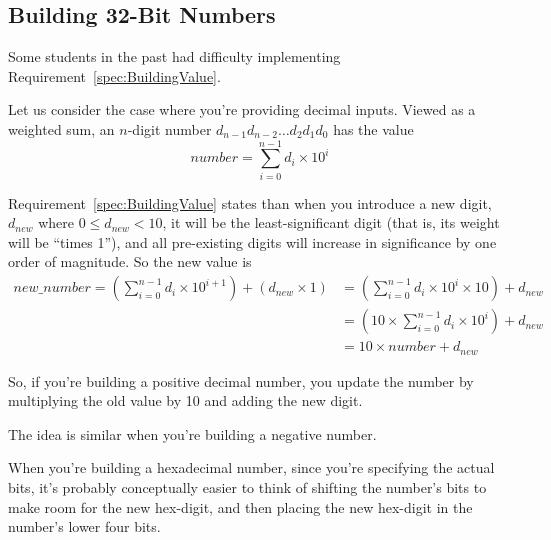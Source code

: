 

\subsection{Building 32-Bit Numbers}

Some students in the past had difficulty implementing Requirement~\ref{spec:BuildingValue}.

Let us consider the case where you're providing decimal inputs.
Viewed as a weighted sum, an $n$-digit number $d_{n-1}d_{n-2}{\dots}d_2d_1d_0$ has the value
\[number = \sum_{i=0}^{n-1}d_i \times 10^i\]

Requirement~\ref{spec:BuildingValue} states than when you introduce a new digit, $d_{new}$ where $0 \leq d_{new} < 10$, it will be the least-significant digit (that is, its weight will be ``times 1''), and all pre-existing digits will increase in significance by one order of magnitude.
So the new value is
\begin{align*}
    new\_number = \left(\sum_{i=0}^{n-1}d_i \times 10^{i+1}\right) + \left(d_{new} \times 1\right)
        & = \left(\sum_{i=0}^{n-1}d_i \times 10^i \times 10\right) + d_{new} \\
        & = \left(10 \times \sum_{i=0}^{n-1}d_i \times 10^i\right) + d_{new} \\
        & = 10 \times number + d_{new}
\end{align*}

So, if you're building a positive decimal number, you update the number by multiplying the old value by 10 and adding the new digit.

The idea is similar when you're building a negative number.

When you're building a hexadecimal number, since you're specifying the actual bits,
it's probably conceptually easier to think of shifting the number's bits to make room for the new hex-digit,
and then placing the new hex-digit in the number's lower four bits.

